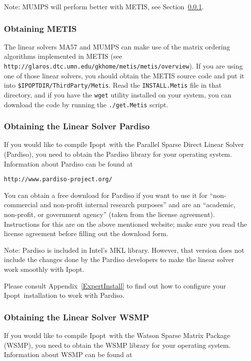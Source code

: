 \documentclass[10pt]{article}
\newcommand{\Ipopt}{{\sc Ipopt}}
\begin{document}
Note: MUMPS will perform better with METIS, see
Section~\ref{sec:METIS}.

\subsubsection{Obtaining METIS}\label{sec:METIS}

The linear solvers MA57 and MUMPS can make use of the matrix ordering
algorithms implemented in METIS (see
\texttt{http://glaros.dtc.umn.edu/gkhome/metis/metis/overview}).  If
you are using one of those linear solvers, you should obtain the METIS
source code and put it into \texttt{\$IPOPTDIR/ThirdParty/Metis}.
Read the \texttt{INSTALL.Metis} file in that directory, and if you
have the \texttt{wget} utility installed on your system, you can
download the code by running the \texttt{./get.Metis} script.

\subsubsection{Obtaining the Linear Solver Pardiso}\label{sec:Pardiso}

If you would like to compile \Ipopt\ with the Parallel Sparse Direct
Linear Solver (Pardiso), you need to obtain the Pardiso library for
your operating system.  Information about Pardiso can be found at

\texttt{http://www.pardiso-project.org/}

You can obtain a free download for Pardiso if you want to use it for
``non-commercial and non-profit internal research purposes'' and are
an ``academic, non-profit, or government agency'' (taken from the
license agreement).  Instructions for this are on the above mentioned
website; make sure you read the license agreement before filling out
the download form.

Note: Pardiso is included in Intel's MKL library.  However, that
version does not include the changes done by the Pardiso developers to
make the linear solver work smoothly with \Ipopt.

Please consult Appendix~\ref{ExpertInstall} to find out how to
configure your \Ipopt\ installation to work with Pardiso.

\subsubsection{Obtaining the Linear Solver WSMP}\label{sec:WSMP}

If you would like to compile \Ipopt\ with the Watson Sparse Matrix
Package (WSMP), you need to obtain the WSMP library for your operating
system.  Information about WSMP can be found at
\end{document}
